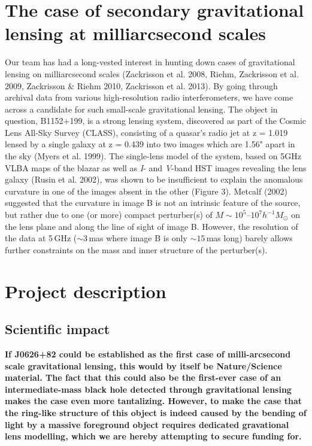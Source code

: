 \documentclass[a4paper, 11pt]{article}
\begin{document}
\section{The case of secondary gravitational lensing at milliarcsecond scales }
Our team has had a long-vested interest in hunting down cases of gravitational lensing on milliarcsecond scales (Zackrisson et al. 2008, Riehm, Zackrisson et al. 2009, Zackrisson \& Riehm 2010, Zackrisson et al. 2013). By going through archival data from various high-resolution radio interferometers, we have come across a candidate for such small-scale gravitational lensing. The object in question, B1152+199, is a strong lensing system, discovered as part of the Cosmic Lens All-Sky Survey (CLASS), consisting of a quasar's radio jet at z = 1.019 lensed by a single galaxy at z = 0.439 into two images which are 1.56" apart in the sky (Myers et al. 1999). The single-lens model of the system, based on 5GHz VLBA maps of the blazar as well as {\it I}- and {\it V}-band HST images revealing the lens galaxy (Rusin et al. 2002), was shown to be insufficient to explain the anomalous curvature in one of the images absent in the other (Figure 3). Metcalf (2002) suggested that the curvature in image B is not an intrinsic feature of the source, but rather due to one (or more) compact perturber(s) of $M\sim10^5$--$10^7 h^{-1} M_\odot$ on the lens plane and along the line of sight of image B. However, the resolution of the data at 5\,GHz ($\sim3$\,mas where image B is only $\sim15$\,mas long) barely allows further constraints on the mass and inner structure of the perturber(s).


\section{Project description}

\subsection{Scientific impact}
{\bf If J0626+82 could be established as the first case of milli-arcsecond scale gravitational lensing, this would by itself be Nature/Science material. The fact that this could also be the first-ever case of an intermediate-mass black hole detected through gravitational lensing makes the case even more tantalizing. However, to make the case that the ring-like structure of this object is indeed caused by the bending of light by a massive foreground object requires dedicated gravational lens modelling, which we are hereby attempting to secure funding for.}
\end{document}
